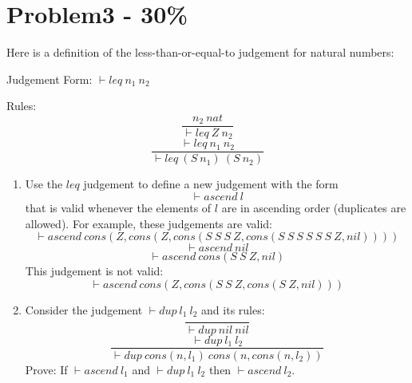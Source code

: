 \documentclass{article}
\newcommand{\answerboxbig}{
    \vspace{20cm} %
}
\begin{document}
\answerboxbig


\section*{Problem3 - 30\%}

Here is a definition of the less-than-or-equal-to judgement for natural numbers:

Judgement Form:  $\vdash leq\ n_1\ n_2$

Rules:
\[
  \frac{n_2\ nat}{\vdash leq\ Z\ n_2}
  \tag{\sc Z-Leq}
\]
\[
  \frac{\vdash leq\ n_1\ n_2}{\vdash leq\ (S\ n_1)\ (S\ n_2)}
  \tag{\sc S-Leq}
\]

\begin{enumerate}[label=\alph*)]

    \item Use the $leq$ judgement to define a new judgement with the form
    \[ \vdash ascend\ l \]
    that is valid whenever the elements of $l$ are in ascending order
    (duplicates are allowed). For example, these judgements are valid:
    \[
    \vdash ascend\ cons (Z, cons (Z, cons (S\ S\ S\ Z, cons (S\ S\ S\ S\ S\ S\ Z, nil))))
    \]
    \[ \vdash ascend\ nil \]
    \[ \vdash ascend\ cons (S\ S\ Z, nil) \]
    This judgement is not valid:
    \[ \vdash ascend\ cons (Z, cons (S\ S\ Z, cons (S\ Z, nil))) \]

    \item Consider the judgement $\vdash dup\ l_1\ l_2$ and its rules:
    \[
    \frac{}{\vdash dup\ nil\ nil}
    \tag{\sc Nil-Dup}
    \]
    \[
    \frac{\vdash dup\ l_1\ l_2}
    {\vdash dup\ cons(n,l_1)\ cons(n,cons(n,l_2))}
    \tag{\sc Cons-Dup}
    \]
    Prove: If $\vdash ascend\ l_1$ and $\vdash dup\ l_1\ l_2$ then $\vdash ascend\ l_2$.

\end{enumerate}

\newpage 
\mbox{}
\newpage
\end{document}
